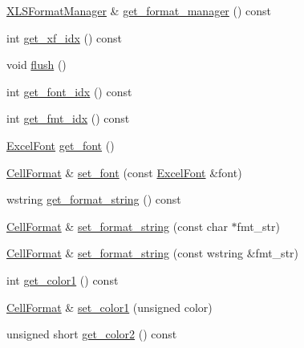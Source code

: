 \begin{DoxyCompactItemize}
\hyperlink{struct_excel_format_1_1_x_l_s_format_manager}{X\+L\+S\+Format\+Manager} \& \hyperlink{struct_excel_format_1_1_cell_format_a03a2431b7624a62dcbeabed790b046c3}{get\+\_\+format\+\_\+manager} () const 
\item 
int \hyperlink{struct_excel_format_1_1_cell_format_af678b79b8c8dbbb6a521c01cadd4ae5d}{get\+\_\+xf\+\_\+idx} () const 
\item 
void \hyperlink{struct_excel_format_1_1_cell_format_aeb3ceb42c80ec9f02a329f9bfa3aafdf}{flush} ()
\item 
int \hyperlink{struct_excel_format_1_1_cell_format_a5a50b4ec7c14f7144ff099a9b52301c9}{get\+\_\+font\+\_\+idx} () const 
\item 
int \hyperlink{struct_excel_format_1_1_cell_format_a1b557944889ef7cd493e6f6fee96a0b8}{get\+\_\+fmt\+\_\+idx} () const 
\item 
\hyperlink{struct_excel_format_1_1_excel_font}{Excel\+Font} \hyperlink{struct_excel_format_1_1_cell_format_a67fe7e97df32e192ab8e32a517f880a0}{get\+\_\+font} ()
\item 
\hyperlink{struct_excel_format_1_1_cell_format}{Cell\+Format} \& \hyperlink{struct_excel_format_1_1_cell_format_a584bde53b0699e233b3ca4e742a1fb5f}{set\+\_\+font} (const \hyperlink{struct_excel_format_1_1_excel_font}{Excel\+Font} \&font)
\item 
wstring \hyperlink{struct_excel_format_1_1_cell_format_a44e908835e6aae1c5bfda4e3adffecc7}{get\+\_\+format\+\_\+string} () const 
\item 
\hyperlink{struct_excel_format_1_1_cell_format}{Cell\+Format} \& \hyperlink{struct_excel_format_1_1_cell_format_aa4982e072d7292699e8302be63b966ba}{set\+\_\+format\+\_\+string} (const char $\ast$fmt\+\_\+str)
\item 
\hyperlink{struct_excel_format_1_1_cell_format}{Cell\+Format} \& \hyperlink{struct_excel_format_1_1_cell_format_afa1e52f7215fda94ecbf92029401fef3}{set\+\_\+format\+\_\+string} (const wstring \&fmt\+\_\+str)
\item 
int \hyperlink{struct_excel_format_1_1_cell_format_aef38f45721098661616821b754098e3b}{get\+\_\+color1} () const 
\item 
\hyperlink{struct_excel_format_1_1_cell_format}{Cell\+Format} \& \hyperlink{struct_excel_format_1_1_cell_format_a13809377fd6a57b49581dbe812e2d260}{set\+\_\+color1} (unsigned color)
\item 
unsigned short \hyperlink{struct_excel_format_1_1_cell_format_a753169625565b7f102e87e8435e29b0b}{get\+\_\+color2} () const 
\item 

\end{DoxyCompactItemize}
